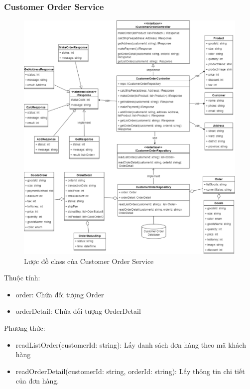 \subsubsection{Customer Order Service}
\begin{figure}[!htp]
	\centering
	\includegraphics[width=13cm]{img/Architecture/service/CustomerOrderService.png}
	\newline
	\caption{Lược đồ class của Customer Order Service}
\end{figure}

Thuộc tính:
\begin{itemize}
	\item order: Chứa đối tượng Order
	\item orderDetail: Chứa đối tượng OrderDetail
\end{itemize}
Phương thức:
\begin{itemize}
	\item readListOrder(customerId: string): Lấy danh sách đơn hàng theo mã khách hàng
	\item readOrderDetail(customerId: string, orderId: string): Lấy thông tin chi tiết của đơn hàng.
\end{itemize}

